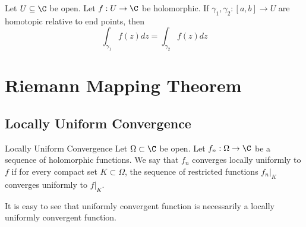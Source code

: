 \documentclass[a4paper]{article}
\begin{document}
\begin{thm}{}{} Let $U\subseteq\C$ be open. Let $f:U\to\C$ be holomorphic. If $\gamma_1,\gamma_2:[a,b]\to U$ are homotopic relative to end points, then $$\int_{\gamma_1}f(z)dz=\int_{\gamma_2}f(z)dz$$
\end{thm}

\pagebreak
\section{Riemann Mapping Theorem}
\subsection{Locally Uniform Convergence}
\begin{defn}{Locally Uniform Convergence}{} Let $\Omega\subset\C$ be open. Let $f_n:\Omega\to\C$ be a sequence of holomorphic functions. We say that $f_n$ converges locally uniformly to $f$ if for every compact set $K\subset\Omega$, the sequence of restricted functions $f_n|_K$ converges uniformly to $f|_K$. 
\end{defn}

It is easy to see that uniformly convergent function is necessarily a locally uniformly convergent function. 
\end{document}
